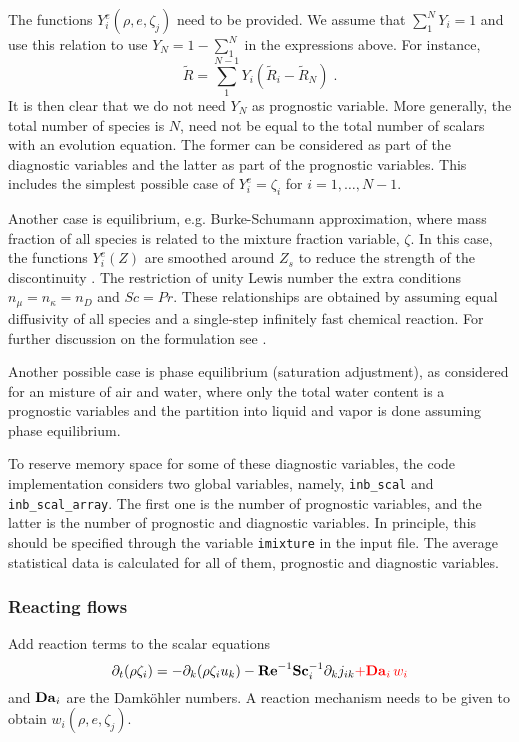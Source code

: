 The functions $Y_i^e(\rho,e,\zeta_j)$ need to be provided. We assume that $\sum_1^NY_i=1$ and use this relation to use $Y_N=1-\sum_1^N$ in the expressions above. For instance,
\begin{equation}
    \tilde{R}=\sum_1^{N-1}Y_i(\tilde{R}_i-\tilde{R}_N) \;.
\end{equation}
It is then clear that we do not need $Y_N$ as prognostic variable. More generally, the total number of species is $N$, need not be equal to the total number of scalars with an evolution equation. The former can be considered as part of the diagnostic variables and the latter as part of the prognostic variables. This includes the simplest possible case of $Y_i^e = \zeta_i$ for $i=1,\ldots,N-1$. 

Another case is equilibrium, e.g. Burke-Schumann approximation, where mass fraction of all species is related to the mixture fraction variable, $\zeta$.  In this case, the functions $Y_i^e(Z)$ are smoothed around $Z_s$ to reduce the strength of the discontinuity \citep{Higuera:1994}. The restriction of unity Lewis number the extra conditions $n_\mu=n_\kappa=n_D$ and $Sc=Pr$. These relationships are obtained by assuming equal diffusivity of all species and a single-step infinitely fast chemical reaction.  For further discussion on the formulation see \cite{Williams:1985}.

Another possible case is phase equilibrium (saturation adjustment), as considered for an misture of air and water, where only the total water content is a prognostic variables and the partition into liquid and vapor is done assuming phase equilibrium. 

To reserve memory space for some of these diagnostic variables, the code implementation considers two global variables, namely, {\tt inb\_scal} and {\tt inb\_scal\_array}. The first one is the number of prognostic variables, and the latter is the number of prognostic and diagnostic variables. In principle, this should be specified through the variable {\tt imixture} in the input file. The average statistical data is calculated for all of them, prognostic and diagnostic variables.

\subsubsection{Reacting flows}

Add reaction terms to the scalar equations
\begin{equation}
    \partial_t (\rho \zeta_i)= -\partial_k (\rho \zeta_i u_k)
    - \mathrm{\bf Re}^{-1}\mathrm{\bf Sc}_i^{-1} \partial_k j_{ik} \color{red}{+\mathrm{\bf Da}_i\,w_i}
\end{equation}
and $\mathrm{\bf Da}_i$ are the Damk{\"o}hler numbers. A reaction mechanism needs to be given to obtain $w_i(\rho,e,\zeta_j)$.

